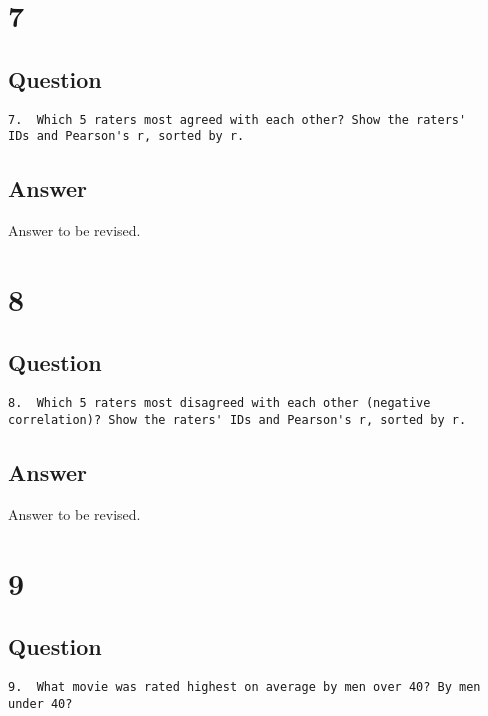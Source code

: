 \documentclass[letterpaper,11pt]{article}
\begin{document}
\newpage

\section*{7}

\subsection*{Question}

\begin{verbatim}
7.  Which 5 raters most agreed with each other? Show the raters'
IDs and Pearson's r, sorted by r.
\end{verbatim}

\newpage
\subsection*{Answer}

Answer to be revised.

\newpage

\section*{8}

\subsection*{Question}

\begin{verbatim}
8.  Which 5 raters most disagreed with each other (negative
correlation)? Show the raters' IDs and Pearson's r, sorted by r.
\end{verbatim}

\newpage
\subsection*{Answer}

Answer to be revised.

\newpage

\section*{9}

\subsection*{Question}

\begin{verbatim}
9.  What movie was rated highest on average by men over 40? By men
under 40?
\end{verbatim}
\end{document}
